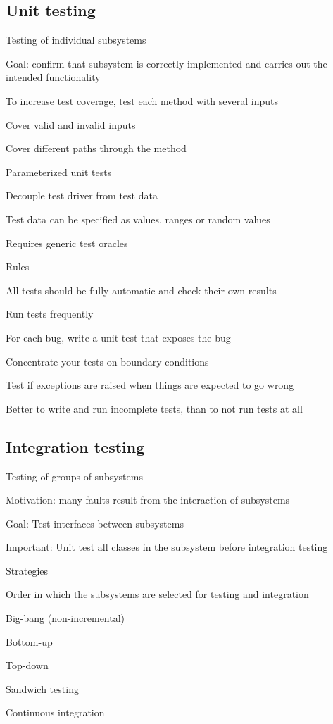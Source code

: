 \subsection{Unit testing}
\enumstart
	\item Testing of individual subsystems
	\item Goal: confirm that subsystem is correctly implemented and carries out the intended functionality
	\item To increase test coverage, test each method with several inputs
	\enumstart
		\item Cover valid and invalid inputs
		\item Cover different paths through the method
	\enumend
	\item Parameterized unit tests
	\enumstart
		\item Decouple test driver from test data
		\item Test data can be specified as values, ranges or random values
		\item Requires generic test oracles
	\enumend
	\item Rules
	\enumstart
		\item All tests should be fully automatic and check their own results
		\item Run tests frequently
		\item For each bug, write a unit test that exposes the bug
		\item Concentrate your tests on boundary conditions
		\item Test if exceptions are raised when things are expected to go wrong
		\item Better to write and run incomplete tests, than to not run tests at all
	\enumend
\enumend

\subsection{Integration testing}
\enumstart
	\item Testing of groups of subsystems
	\item Motivation: many faults result from the interaction of subsystems
	\item Goal: Test interfaces between subsystems
	\item Important: Unit test all classes in the subsystem before integration testing
	\item Strategies
	\enumstart
		\item Order in which the subsystems are selected for testing and integration
		\item Big-bang (non-incremental)
		\item Bottom-up
		\item Top-down
		\item Sandwich testing
		\item Continuous integration
	\enumend
\enumend


